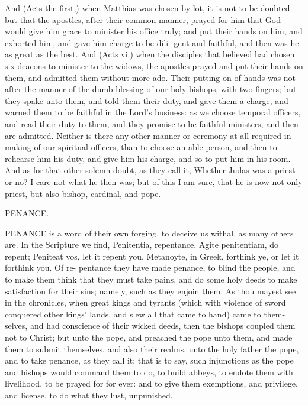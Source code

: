 \documentclass{custom}
\begin{document}
And (Acts the first,) when Matthias was chosen by lot, 
it is not to be doubted but that the apostles, after their 
common manner, prayed for him that God would give him 
grace to minister his office truly; and put their hands on 
him, and exhorted him, and gave him charge to be dili- 
gent and faithful, and then was he as great as the best. 
And (Acts vi.) when the disciples that believed had chosen 
six deacons to minister to the widows, the apostles prayed 
and put their hands on them, and admitted them without 
more ado. Their putting on of hands was not after the 
manner of the dumb blessing of our holy bishops, with 
two fingers; but they spake unto them, and told them their 
duty, and gave them a charge, and warned them to be 
faithful in the Lord's business: as we choose temporal 
officers, and read their duty to them, and they promise to 
be faithful ministers, and then are admitted. Neither is 
there any other manner or ceremony at all required in 
making of our spiritual officers, than to choose an able 
person, and then to rehearse him his duty, and give him 
his charge, and so to put him in his room. And as for 
that other solemn doubt, as they call it, Whether Judas 
was a priest or no? I care not what he then was; but of
this I am sure, that he is now not only priest, but also
bishop, cardinal, and pope. 


PENANCE. 

PENANCE is a word of their own forging, to deceive 
us withal, as many others are. In the Scripture 
we find, Penitentia, repentance. Agite penitentiam, do 
repent; Peniteat vos, let it repent you. Metanoyte, in 
Greek, forthink ye, or let it forthink you. Of re-
pentance they have made penance, to blind the people,
and to make them think that they must take pains, 
and do some holy deeds to make satisfaction for their 
sins; namely, such as they enjoin them. As thou mayest 
see in the chronicles, when great kings and tyrants 
(which with violence of sword conquered other kings' 
lands, and slew all that came to hand) came to them- 
selves, and had conscience of their wicked deeds, then the 
bishops coupled them not to Christ; but unto the pope, 
and preached the pope unto them, and made them to 
submit themselves, and also their realms, unto the holy 
father the pope, and to take penance, as they call it; 
that is to say, such injunctions as the pope and bishops 
would command them to do, to build abbeys, to endote 
them with livelihood, to be prayed for for ever: and to 
give them exemptions, and privilege, and license, to do 
what they lust, unpunished. 
\end{document}
